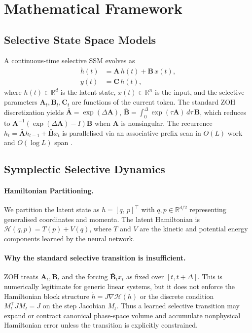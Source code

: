 \documentclass[10pt,twocolumn]{article}
\newcommand{\R}{\mathbb{R}}
\newcommand{\calH}{\mathcal{H}}
\begin{document}
\section{Mathematical Framework}
\label{sec:framework}

\subsection{Selective State Space Models}
A continuous-time selective SSM evolves as
\begin{align}
  \dot{h}(t) &= \mathbf{A}\,h(t) + \mathbf{B}\,x(t), \label{eq:ssm_cont}\\
  y(t) &= \mathbf{C}\,h(t),
\end{align}
where $h(t)\!\in\!\R^{d}$ is the latent state, $x(t)\!\in\!\R^{n}$
is the input, and the selective parameters
$\mathbf{A}_t,\mathbf{B}_t,\mathbf{C}_t$ are functions of the current token.
The standard ZOH discretization yields
$\bar{\mathbf{A}} = \exp(\Delta\mathbf{A})$,
$\bar{\mathbf{B}} = \int_0^\Delta \exp(\tau\mathbf{A})\,d\tau\,\mathbf{B}$,
which reduces to
$\mathbf{A}^{-1}(\exp(\Delta\mathbf{A})-I)\mathbf{B}$
when $\mathbf{A}$ is nonsingular.
The recurrence $h_t = \bar{\mathbf{A}}h_{t-1} + \bar{\mathbf{B}}x_t$
is parallelised via an associative prefix scan in $O(L)$ work and
$O(\log L)$ span \cite{blelloch1990prefix}.

\subsection{Symplectic Selective Dynamics}
\label{sec:symplectic}

\paragraph{Hamiltonian Partitioning.}
We partition the latent state as $h=[q,\,p]^{\top}$ with
$q,p\in\R^{d/2}$ representing generalised coordinates and momenta.
The latent Hamiltonian is
$\calH(q,p) = T(p) + V(q)$,
where $T$ and $V$ are the kinetic and potential energy components
learned by the neural network.

\paragraph{Why the standard selective transition is insufficient.}
ZOH treats $\mathbf{A}_t,\mathbf{B}_t$ and the forcing
$\bar{\mathbf{B}}_t x_t$ as fixed over $[t,t+\Delta]$.
This is numerically legitimate for generic linear systems, but it does not
enforce the Hamiltonian block structure
$\dot{h}=J\nabla\calH(h)$ or the discrete condition
$M_t^{\top}JM_t=J$ on the step Jacobian $M_t$.
Thus a learned selective transition may expand or contract canonical
phase-space volume and accumulate nonphysical Hamiltonian error unless the
transition is explicitly constrained.
\end{document}
